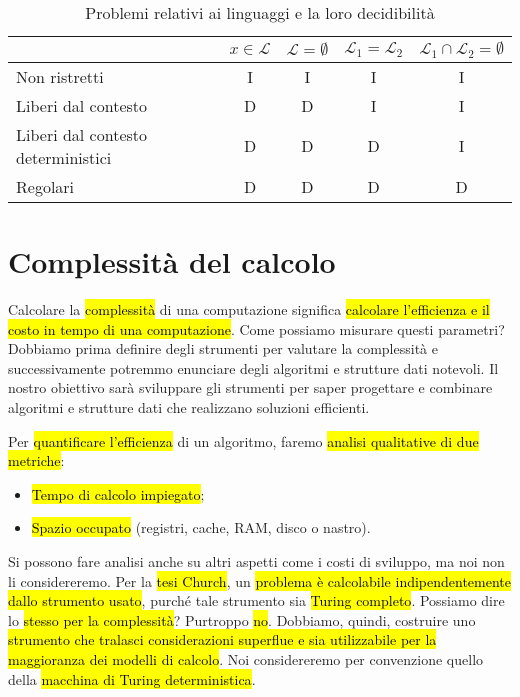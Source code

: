 \documentclass[a4paper,11pt,twoside]{article}
\theoremstyle{plain}
\theoremstyle{definition}
\theoremstyle{remark}
\begin{document}
\begin{table}[htb]
  \centering
  \begin{tabular}{l|cccc}
    \toprule
    & $x \in \mathcal{L}$ & $\mathcal{L} = \emptyset$ & $\mathcal{L}_1 = \mathcal{L}_2$ & $\mathcal{L}_1 \cap \mathcal{L}_2 = \emptyset$ \\
    \midrule
    Non ristretti & I & I & I & I \\
    Liberi dal contesto & D & D & I & I \\
    Liberi dal contesto deterministici & D & D & D & I \\
    Regolari & D & D & D & D \\
    \bottomrule
  \end{tabular}
  \caption{Problemi relativi ai linguaggi e la loro decidibilità}%
  \label{tab:prob-lang}
\end{table}

\section{Complessità del calcolo}\label{sec:complessita}

Calcolare la \hl{complessità} di una computazione significa \hl{calcolare
l'efficienza e il costo in tempo di una computazione}. Come possiamo misurare
questi parametri?  Dobbiamo prima definire degli strumenti per valutare la
complessità e successivamente potremmo enunciare degli algoritmi e strutture
dati notevoli. Il nostro obiettivo sarà sviluppare gli strumenti per saper
progettare e combinare algoritmi e strutture dati che realizzano soluzioni
efficienti.

Per \hl{quantificare l'efficienza} di un algoritmo, faremo \hl{analisi
qualitative di due metriche}:

\begin{itemize}
  \item \hl{Tempo di calcolo impiegato};
  \item \hl{Spazio occupato} (registri, cache, RAM, disco o nastro).
\end{itemize}

Si possono fare analisi anche su altri aspetti come i costi di sviluppo, ma noi
non li considereremo. Per la \hl{tesi Church}, un \hl{problema è calcolabile
indipendentemente dallo strumento usato}, purché tale strumento sia \hl{Turing
completo}. Possiamo dire lo \hl{stesso per la complessità}? Purtroppo \hl{no}.
Dobbiamo, quindi, costruire uno \hl{strumento che tralasci considerazioni
superflue e sia utilizzabile per la maggioranza dei modelli di calcolo}. Noi
considereremo per convenzione quello della \hl{macchina di Turing
deterministica}.
\end{document}
